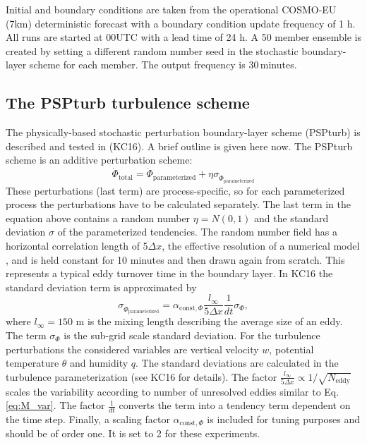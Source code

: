 \documentclass[a4paper, 12pt]{article}
\begin{document}
Initial and boundary conditions are taken from the operational COSMO-EU (7km) deterministic forecast with a boundary condition update frequency of 1 h. All runs are started at 00UTC with a lead time of 24 h. A 50 member ensemble is created by setting a different random number seed in the stochastic boundary-layer scheme for each member. The output frequency is 30\,minutes.

\subsection{The PSPturb turbulence scheme}
The physically-based stochastic perturbation boundary-layer scheme (PSPturb) is described and tested in \cite{Kober2016}(KC16). A brief outline is given here now. The PSPturb scheme is an additive perturbation scheme:
\begin{equation} \label{eq:PSPturb_additive}
\dot{\Phi}_{\mathrm{total}} = \dot{\Phi}_{\mathrm{parameterized}} + \eta \sigma_{\dot{\Phi}_{\mathrm{parameterized}}}
\end{equation}
These perturbations (last term) are process-specific, so for each parameterized process the perturbations have to be calculated separately. The last term in the equation above contains a random number $\eta = \mathit{N}(0,1)$ and the standard deviation $\sigma$ of the parameterized tendencies. The random number field has a horizontal correlation length of 5$\Delta x$, the effective resolution of a numerical model \citep{Skamarock2004}, and is held constant for 10 minutes and then drawn again from scratch. This represents a typical eddy turnover time in the boundary layer. In KC16 the standard deviation term is approximated by
\begin{equation} \label{eq:PSPturb_std}
\sigma_{\dot{\Phi}_{\mathrm{parameterized}}} = \alpha_{\mathrm{const}, \Phi} \frac{\mathit{l_{\infty}}}{5 \Delta x}\frac{1}{dt} \sigma_{\Phi},
\end{equation}
where $\mathit{l_{\infty}} = 150$ m is the mixing length describing the average size of an eddy. The term $\sigma_{\Phi}$ is the sub-grid scale standard deviation. For the turbulence perturbations the considered variables are vertical velocity $w$, potential temperature $\theta$ and humidity $q$. The standard deviations are calculated in the turbulence parameterization (see KC16 for details). The factor $\frac{\mathit{l_{\infty}}}{5 \Delta x} \propto 1/\sqrt{N_{\mathrm{eddy}}}$ scales the variability according to number of unresolved eddies similar to Eq. \ref{eq:M_var}. The factor $\frac{1}{dt}$  converts the term into a tendency term dependent on the time step. Finally, a scaling factor $\alpha_{\mathrm{const}, \Phi}$ is included for tuning purposes and should be of order one. It is set to 2 for these experiments. 
\end{document}
